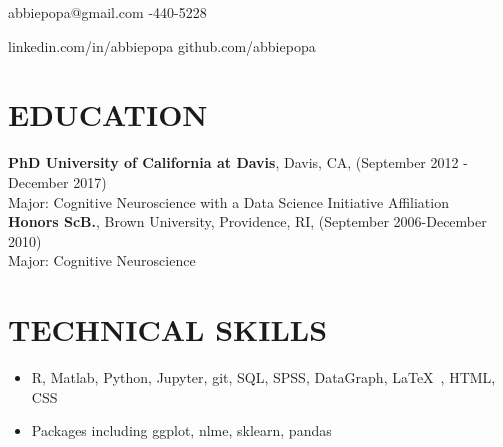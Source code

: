 \documentclass[line,margin,10pt]{res}
\begin{document}
 
\begin{resume}
\hoffset\centerline 
{abbiepopa@gmail.com \quad \quad \quad \quad  \quad \quad \quad \quad \quad \quad \quad \quad \quad \quad \quad \quad \quad \quad \quad \quad \quad\quad \quad \quad \quad \quad \quad \quad \quad \quad \quad \quad  \quad \quad {}-440-5228}
\hoffset\centerline 
{\hspace{0.05cm} linkedin.com/in/abbiepopa \quad \quad \quad \quad \quad \quad \quad \quad \quad \quad \quad\quad \quad \quad \quad \quad \quad \quad \quad \quad \quad \quad  \quad \quad \quad  \quad \quad \quad   \quad github.com/abbiepopa}
 
\section{EDUCATION} 
\textbf{PhD University of California at Davis}, Davis, CA, (September 2012 - December 2017)\\
Major: Cognitive Neuroscience with a Data Science Initiative Affiliation\\
\textbf{Honors ScB.}, Brown University, Providence, RI, (September 2006-December 2010)\\
                Major: Cognitive Neuroscience
                
 \section{TECHNICAL SKILLS} 
 \begin{itemize}[leftmargin=-2pt] \itemsep -2pt
\item [] R, Matlab, Python, Jupyter, git, SQL, SPSS, DataGraph, \LaTeX\ , HTML, CSS
\item []Packages including ggplot, nlme, sklearn, pandas
 \end{itemize}
								

\end{resume}
\end{document}
